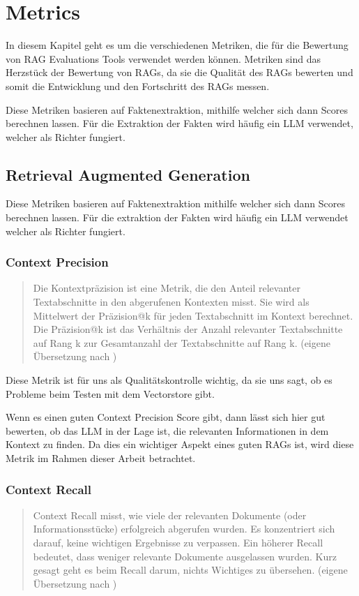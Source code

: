 \chapter{Metrics}

\label{chap:formal}
In diesem Kapitel geht es um die verschiedenen Metriken, die für die Bewertung von RAG Evaluations Tools verwendet werden können.
Metriken sind das Herzstück der Bewertung von RAGs, da sie die Qualität des RAGs bewerten und somit die Entwicklung und den Fortschritt des RAGs messen.

Diese Metriken basieren auf Faktenextraktion, mithilfe welcher sich dann Scores berechnen lassen.
Für die Extraktion der Fakten wird häufig ein LLM verwendet, welcher als Richter fungiert.

\section{Retrieval Augmented Generation}
Diese Metriken basieren auf Faktenextraktion mithilfe welcher sich dann Scores berechnen lassen.
Für die extraktion der Fakten wird häufig ein LLM verwendet welcher als Richter fungiert.


\subsection{Context Precision}
\begin{quote}
Die Kontextpräzision ist eine Metrik, die den Anteil relevanter Textabschnitte in den abgerufenen Kontexten misst.
Sie wird als Mittelwert der Präzision@k für jeden Textabschnitt im Kontext berechnet.
Die Präzision@k ist das Verhältnis der Anzahl relevanter Textabschnitte auf Rang k zur Gesamtanzahl der Textabschnitte auf Rang k.
(eigene Übersetzung nach \cite{ragas_context_precision})
\end{quote}
Diese Metrik ist für uns als Qualitätskontrolle wichtig, da sie uns sagt, ob es Probleme beim Testen mit dem Vectorstore gibt.

Wenn es einen guten Context Precision Score gibt, dann lässt sich hier gut bewerten, ob das LLM in der Lage ist, die relevanten Informationen in dem Kontext zu finden.
Da dies ein wichtiger Aspekt eines guten RAGs ist, wird diese Metrik im Rahmen dieser Arbeit betrachtet.

\subsection{Context Recall}
\begin{quote}
Context Recall misst, wie viele der relevanten Dokumente (oder Informationsstücke) erfolgreich abgerufen wurden.
Es konzentriert sich darauf, keine wichtigen Ergebnisse zu verpassen.
Ein höherer Recall bedeutet, dass weniger relevante Dokumente ausgelassen wurden.
Kurz gesagt geht es beim Recall darum, nichts Wichtiges zu übersehen.
(eigene Übersetzung nach \cite{ragas_context_recall})
\end{quote}

